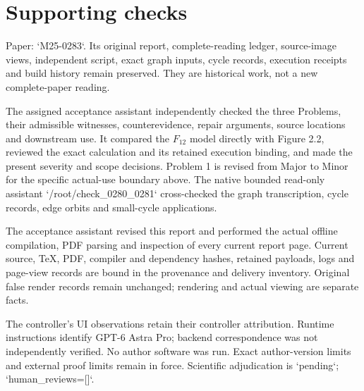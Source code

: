 \documentclass[10pt]{article}
\begin{document}
\section*{Supporting checks}
Paper: `M25-0283`. Its original report, complete-reading ledger, source-image views, independent script, exact graph inputs, cycle records, execution receipts and build history remain preserved. They are historical work, not a new complete-paper reading.\par
The assigned acceptance assistant independently checked the three Problems, their admissible witnesses, counterevidence, repair arguments, source locations and downstream use. It compared the \(F_{12}\) model directly with Figure 2.2, reviewed the exact calculation and its retained execution binding, and made the present severity and scope decisions. Problem 1 is revised from Major to Minor for the specific actual-use boundary above. The native bounded read-only assistant `/root/check\_0280\_0281` cross-checked the graph transcription, cycle records, edge orbits and small-cycle applications.\par
The acceptance assistant revised this report and performed the actual offline compilation, PDF parsing and inspection of every current report page. Current source, TeX, PDF, compiler and dependency hashes, retained payloads, logs and page-view records are bound in the provenance and delivery inventory. Original false render records remain unchanged; rendering and actual viewing are separate facts.\par
The controller’s UI observations retain their controller attribution. Runtime instructions identify GPT-6 Astra Pro; backend correspondence was not independently verified. No author software was run. Exact author-version limits and external proof limits remain in force. Scientific adjudication is `pending`; `human\_reviews=[]`.\par
\end{document}

